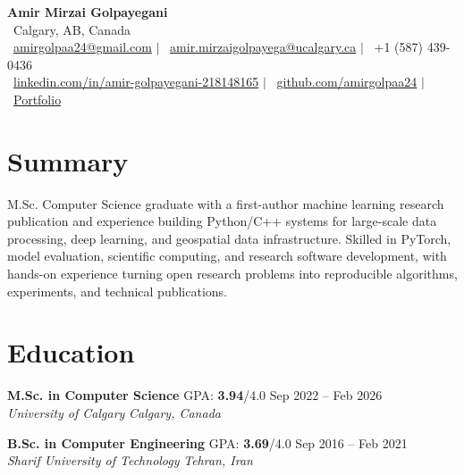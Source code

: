 \documentclass[a4paper,10pt]{article}
\newcommand{\resumeEducationSubheading}[5]{
    \textbf{#1} \hfill #2 \hfill #3 \\
    \textit{#4} \hfill \textit{#5}
}
\begin{document}

\begin{center}
    {\LARGE \textbf{Amir Mirzai Golpayegani}} \\[0.25em]
    \faMapMarker*~Calgary, AB, Canada \\[0.25em]
    \faEnvelope~\href{mailto:amirgolpaa24@gmail.com}{amirgolpaa24@gmail.com}
    $|$
    \faEnvelope~\href{mailto:amir.mirzaigolpayega@ucalgary.ca}{amir.mirzaigolpayega@ucalgary.ca}
    $|$
    \faPhone*~+1 (587) 439-0436 \\[0.25em]
    \faLinkedin~\href{https://linkedin.com/in/amir-golpayegani-218148165}{linkedin.com/in/amir-golpayegani-218148165}
    $|$
    \faGithub~\href{https://github.com/amirgolpaa24}{github.com/amirgolpaa24}
    $|$
    \faGlobe~\href{https://amir-portfolio-navy.vercel.app/}{Portfolio}
\end{center}


\section*{Summary}

M.Sc. Computer Science graduate with a first-author machine learning research publication and experience building Python/C++ systems for large-scale data processing, deep learning, and geospatial data infrastructure. Skilled in PyTorch, model evaluation, scientific computing, and research software development, with hands-on experience turning open research problems into reproducible algorithms, experiments, and technical publications.


\section*{Education}

\resumeEducationSubheading
{M.Sc. in Computer Science}
{GPA: \textbf{3.94}/4.0}
{Sep 2022 -- Feb 2026}
{University of Calgary}
{Calgary, Canada}

\vspace{0.35em}

\resumeEducationSubheading
{B.Sc. in Computer Engineering}
{GPA: \textbf{3.69}/4.0}
{Sep 2016 -- Feb 2021}
{Sharif University of Technology}
{Tehran, Iran}

\end{document}
